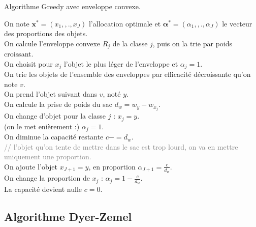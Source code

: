 \documentclass{article}
\newcommand\comm[1]{\footnotesize\ttfamily\textcolor{gray}{// #1}}
\begin{document}
\begin{algorithm}[!ht]
\caption{Algorithme Greedy avec enveloppe convexe.}
\label{alg:greedy-convexe}
\small
{}
	On note $\mathbf{x}^{*} = (x_1, ,., x_{J})$ l'allocation optimale et $\mathbf{\alpha}^{*} = (\alpha_1, ,., \alpha_{J})$ le vecteur des proportions des objets.\\
	{
	    On calcule l'enveloppe convexe $R_j$ de la classe $j$, puis on la trie par poids croissant.\\
	    On choisit pour $x_j$ l'objet le plus léger de l'enveloppe et $\alpha_j=1$.\\
	}
	On trie les objets de l'ensemble des enveloppes par efficacité décroissante qu'on note $v$.\\
	{
	    On prend l'objet suivant dans $v$, noté $y$.\\
	    {
		    {
		        On calcule la prise de poids du sac $d_w = w_y-w_{x_j}$.\\
		        {
		            On change d'objet pour la classe $j$ : $x_j = y$.\\
		            (on le met enièrement :) $\alpha_j = 1$.\\
		            On diminue la capacité restante $c -= d_w$.\\
		            
		        }
		        {
		            \comm{l'objet qu'on tente de mettre dans le sac est trop lourd, on va en mettre uniquement une proportion.}\\
		            On ajoute l'objet $x_{J+1} = y$, en proportion
		            $\alpha_{J+1} = \frac{c}{d_w}$.\\
                    On change la proportion de $x_j$ : $\alpha_j = 1-\frac{c}{d_w}$.\\
                    La capacité devient nulle $c = 0$.
		        }
		    }
	    }
	}
\end{algorithm}

\subsection{Algorithme Dyer-Zemel}
\end{document}
